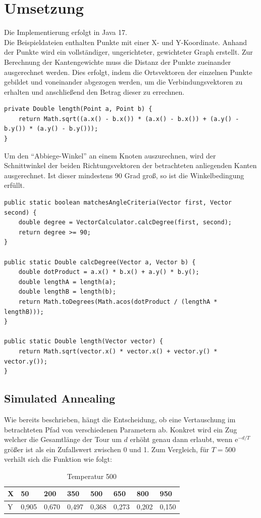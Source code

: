 \section{Umsetzung}\label{sec:umsetzung}
Die Implementierung erfolgt in Java 17. \\
Die Beispieldateien enthalten Punkte mit einer X- und Y-Koordinate.
Anhand der Punkte wird ein vollständiger, ungerichteter, gewichteter Graph erstellt.
Zur Berechnung der Kantengewichte muss die Distanz der Punkte zueinander ausgerechnet werden.
Dies erfolgt, indem die Ortsvektoren der einzelnen Punkte gebildet und voneinander abgezogen werden, um die
Verbindungsvektoren zu erhalten und anschlie{\ss}end den Betrag dieser zu errechnen.
\begin{lstlisting}[label={lst:distance}]
private Double length(Point a, Point b) {
    return Math.sqrt((a.x() - b.x()) * (a.x() - b.x()) + (a.y() - b.y()) * (a.y() - b.y()));
}
\end{lstlisting}
Um den ``Abbiege-Winkel'' an einem Knoten auszurechnen, wird der Schnittwinkel der beiden Richtungsvektoren der
betrachteten anliegenden Kanten ausgerechnet.
Ist dieser mindestens 90 Grad gro{\ss}, so ist die Winkelbedingung erfüllt.
\begin{lstlisting}[label={lst:vector-calc}]
public static boolean matchesAngleCriteria(Vector first, Vector second) {
    double degree = VectorCalculator.calcDegree(first, second);
    return degree >= 90;
}

public static Double calcDegree(Vector a, Vector b) {
    double dotProduct = a.x() * b.x() + a.y() * b.y();
    double lengthA = length(a);
    double lengthB = length(b);
    return Math.toDegrees(Math.acos(dotProduct / (lengthA * lengthB)));
}

public static Double length(Vector vector) {
    return Math.sqrt(vector.x() * vector.x() + vector.y() * vector.y());
}
\end{lstlisting}

\subsection{Simulated Annealing}\label{subsec:simulated-annealing-implementation}
Wie bereits beschrieben, hängt die Entscheidung, ob eine Vertauschung im betrachteten Pfad von verschiedenen Parametern ab.
Konkret wird ein Zug welcher die Gesamtlänge der Tour um $d$ erhöht genau dann erlaubt,
wenn $\mathrm{e}^{-d/T}$ grö{\ss}er ist als ein Zufallswert zwischen 0 und 1.
Zum Vergleich, für $T=500$ verhält sich die Funktion wie folgt: \\
\begin{table}[h]
    \centering
    \begin{tabular}{|l|l|l|l|l|l|l|l|}
        \hline
        X & 50    & 200   & 350   & 500   & 650   & 800   & 950   \\ \hline
        Y & 0,905 & 0,670 & 0,497 & 0,368 & 0,273 & 0,202 & 0,150 \\ \hline
    \end{tabular}
    \caption{Temperatur 500}
    \label{tab:simulated-annealing}
\end{table}

